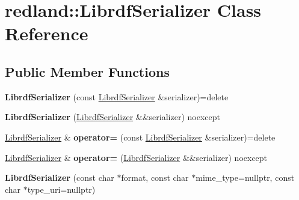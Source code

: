 \hypertarget{classredland_1_1LibrdfSerializer}{}\section{redland\+:\+:Librdf\+Serializer Class Reference}
\label{classredland_1_1LibrdfSerializer}
\subsection*{Public Member Functions}
\begin{DoxyCompactItemize}
\item 
\mbox{\label{classredland_1_1LibrdfSerializer_a084920f2dadf9aff9abff2fbe4e302e9}} 
{\bfseries Librdf\+Serializer} (const \hyperlink{classredland_1_1LibrdfSerializer}{Librdf\+Serializer} \&serializer)=delete
\item 
\mbox{\label{classredland_1_1LibrdfSerializer_ac0df7aa8f6a63de75d63f33d9eb3b201}} 
{\bfseries Librdf\+Serializer} (\hyperlink{classredland_1_1LibrdfSerializer}{Librdf\+Serializer} \&\&serializer) noexcept
\item 
\mbox{\label{classredland_1_1LibrdfSerializer_a07c9ec356305e42c4990357dffb6bfd1}} 
\hyperlink{classredland_1_1LibrdfSerializer}{Librdf\+Serializer} \& {\bfseries operator=} (const \hyperlink{classredland_1_1LibrdfSerializer}{Librdf\+Serializer} \&serializer)=delete
\item 
\mbox{\label{classredland_1_1LibrdfSerializer_a3f1049838f6c9b3baee42fd1ab99d9e3}} 
\hyperlink{classredland_1_1LibrdfSerializer}{Librdf\+Serializer} \& {\bfseries operator=} (\hyperlink{classredland_1_1LibrdfSerializer}{Librdf\+Serializer} \&\&serializer) noexcept
\item 
\mbox{\label{classredland_1_1LibrdfSerializer_aadcc241a243f87fce5152dc6420d1625}} 
{\bfseries Librdf\+Serializer} (const char $\ast$format, const char $\ast$mime\+\_\+type=nullptr, const char $\ast$type\+\_\+uri=nullptr)
\item 
\mbox{\label{classredland_1_1LibrdfSerializer_ab5ef7eaa294357a931b826acc1ab932f}} 

\end{DoxyCompactItemize}
